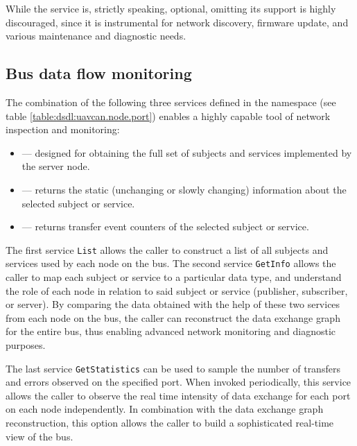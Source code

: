 While the service is, strictly speaking, optional, omitting its support is highly discouraged,
since it is instrumental for network discovery, firmware update, and various maintenance and diagnostic needs.


\subsection{Bus data flow monitoring}

The combination of the following three services defined in the namespace 
(see table \ref{table:dsdl:uavcan.node.port}) enables a highly capable tool of network inspection and monitoring:
\begin{itemize}
    \item {} --- designed for obtaining the full set of subjects and services
    implemented by the server node.

    \item {} --- returns the static (unchanging or slowly changing)
    information about the selected subject or service.

    \item {} --- returns transfer event counters of
    the selected subject or service.
\end{itemize}

The first service \verb|List| allows the caller to construct a list of all subjects and services used by each
node on the bus.
The second service \verb|GetInfo| allows the caller to map each subject or service to a particular data type,
and understand the role of each node in relation to said subject or service
(publisher, subscriber, or server).
By comparing the data obtained with the help of these two services from each node on the bus,
the caller can reconstruct the data exchange graph for the entire bus,
thus enabling advanced network monitoring and diagnostic purposes.

The last service \verb|GetStatistics| can be used to sample the number of transfers and errors observed
on the specified port.
When invoked periodically, this service allows the caller to observe the real time intensity of data exchange
for each port on each node independently.
In combination with the data exchange graph reconstruction,
this option allows the caller to build a sophisticated real-time view of the bus.

